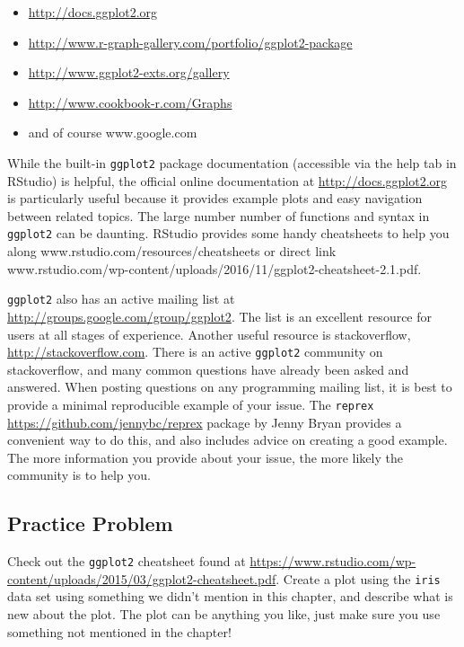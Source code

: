 \documentclass[]{krantz}
\providecommand{\tightlist}{%
  \setlength{\itemsep}{0pt}\setlength{\parskip}{0pt}}
\begin{document}
\begin{itemize}
\tightlist
\item
  \url{http://docs.ggplot2.org}
\item
  \url{http://www.r-graph-gallery.com/portfolio/ggplot2-package}
\item
  \url{http://www.ggplot2-exts.org/gallery}
\item
  \url{http://www.cookbook-r.com/Graphs}
\item
  and of course www.google.com
\end{itemize}

While the built-in \texttt{ggplot2} package documentation (accessible
via the help tab in RStudio) is helpful, the official online
documentation at \url{http://docs.ggplot2.org} is particularly useful
because it provides example plots and easy navigation between related
topics. The large number number of functions and syntax in
\texttt{ggplot2} can be daunting. RStudio provides some handy
cheatsheets to help you along www.rstudio.com/resources/cheatsheets or
direct link
www.rstudio.com/wp-content/uploads/2016/11/ggplot2-cheatsheet-2.1.pdf.

\texttt{ggplot2} also has an active mailing list at
\url{http://groups.google.com/group/ggplot2}. The list is an excellent
resource for users at all stages of experience. Another useful resource
is stackoverflow, \url{http://stackoverflow.com}. There is an active
\texttt{ggplot2} community on stackoverflow, and many common questions
have already been asked and answered. When posting questions on any
programming mailing list, it is best to provide a minimal reproducible
example of your issue. The \texttt{reprex}
\url{https://github.com/jennybc/reprex} package by Jenny Bryan provides
a convenient way to do this, and also includes advice on creating a good
example. The more information you provide about your issue, the more
likely the community is to help you.

\subsection{Practice Problem}\label{practice-problem-5}

Check out the \texttt{ggplot2} cheatsheet found at
\url{https://www.rstudio.com/wp-content/uploads/2015/03/ggplot2-cheatsheet.pdf}.
Create a plot using the \texttt{iris} data set using something we didn't
mention in this chapter, and describe what is new about the plot. The
plot can be anything you like, just make sure you use something not
mentioned in the chapter!
\end{document}
